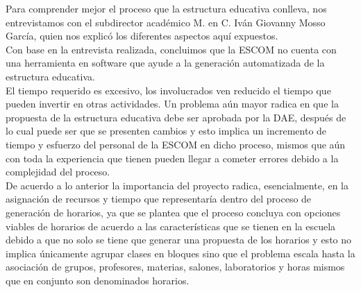 \label{sec:justificacion}

Para comprender mejor el proceso que la estructura educativa conlleva, nos entrevistamos con el subdirector académico M. en C. Iván Giovanny Mosso García, quien nos explicó los diferentes aspectos aquí expuestos. \\

Con base en la entrevista realizada, concluimos que la ESCOM no cuenta con una herramienta en software que ayude a la generación automatizada de la estructura educativa.  \\

El tiempo requerido es excesivo, los involucrados ven reducido el tiempo que pueden invertir en otras actividades. Un problema aún mayor radica en que la propuesta de la estructura educativa debe ser aprobada por la DAE, después de lo cual puede ser
que se presenten cambios y esto implica un incremento de tiempo y esfuerzo del personal de la ESCOM en dicho proceso, mismos que aún con toda la experiencia que tienen pueden llegar a cometer errores debido a la complejidad del proceso.  \\

De acuerdo a lo anterior la importancia del proyecto radica, esencialmente, en la asignación de recursos y tiempo que representaría dentro del proceso de generación de horarios, ya que se plantea que el proceso concluya con opciones viables de horarios de acuerdo a las características que se tienen en la escuela debido a que no solo se tiene que generar una propuesta de los horarios y esto no implica únicamente agrupar clases en bloques sino que el problema escala hasta la asociación de grupos, profesores, materias, salones, laboratorios y horas mismos que en conjunto son denominados horarios.
